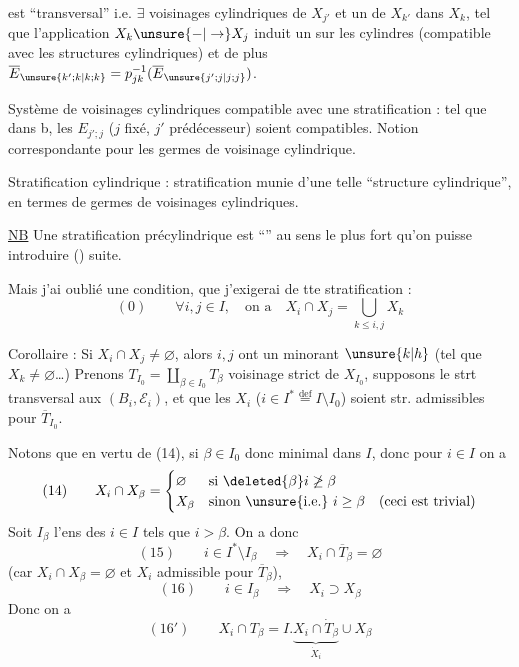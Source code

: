 est ``transversal'' i.e.  $\exists$ voisinages cylindriques
de $X_{j'}$  et un de $X_{k'}$ dans $X_k$, tel que l'application
$X_k\unsure{-|\to}X_j$ induit un  sur les
cylindres (compatible avec les structures
cylindriques) et de plus
$\overline E_{\unsure{k';k|k;k}}=p_{jk}^{-1}(\overline E_{\unsure{j';j|j;j}})$.

Système de voisinages cylindriques 
compatible avec une stratification : tel que
dans b, les $E_{j';j}$ ($j$ fixé, $j'$ prédécesseur)
soient compatibles. Notion correspondante
pour les germes de voisinage cylindrique.

Stratification cylindrique : stratification munie
d'une telle ``structure cylindrique'', en
termes de germes de voisinages cylindriques.

\uline{NB} Une stratification précylindrique 
est 
``'' au sens le plus fort qu'on
puisse introduire  () suite.

Mais j'ai oublié une condition, que j'exigerai
de tte stratification :
\[
(0)\qquad \forall i,j\in I,\quad\text{on a}\quad
X_i\cap X_j=\bigcup_{k\le i,j}X_k
\]

Corollaire : Si $X_i\cap X_j\ne\varnothing$, alors $i,j$ ont un
minorant $\unsure{k|h}$ (tel que  $X_k\ne\varnothing$\ldots)
Prenons $T_{I_0}=\coprod_{\beta\in I_0}T_\beta$ voisinage
 strict
de $X_{I_0}$, supposons le strt transversal aux
$(B_i,\mathcal E_i)$, et  que les $X_i$
($i\in I^*\overset{\mathrm{def}}=I\setminus I_0$)
soient str. admissibles pour $\overline T_{I_0}$.

Notons que en vertu de (14), si $\beta\in I_0$ donc
minimal dans $I$, donc pour $i\in I$ on a
\[
(14)\qquad
X_i\cap X_\beta=
\begin{cases}
\varnothing & \text{si }\deleted{\beta}i\not\ge\beta\\
X_\beta & \text{sinon \unsure{i.e.} }i\ge\beta\quad(\text{ceci est trivial})
\end{cases}
\]
Soit $I_\beta$ l'ens des $i\in I$ tels que $i>\beta$.
On a donc
\[
(15)\qquad i\in I^*\setminus I_\beta\quad\Longrightarrow\quad
X_i\cap\overline T_\beta=\varnothing
\]
(car $X_i\cap X_\beta=\varnothing$ et $X_i$ admissible pour $\overline T_\beta$),
\[
(16)\qquad i\in I_\beta\quad\Longrightarrow\quad X_i\supset X_\beta
\]
Donc on a
\[
(16')\qquad X_i\cap T_\beta
=I.\underbrace{X_i\cap\dot T_\beta}_{\dot X_i}\cup X_\beta
\]

